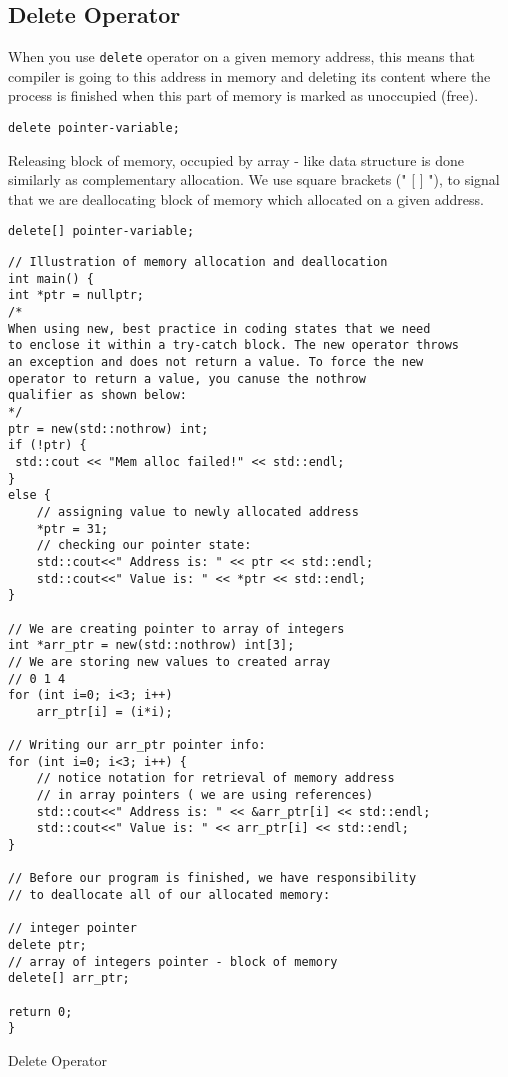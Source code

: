 \documentclass[11pt, a4paper]{article}
\begin{document}
\subsection{Delete Operator}%
\label{sub:delete_operator}


When you use \texttt{delete} operator on a given memory address, this means that compiler is going to this address in memory and deleting its content where the process is finished when this part of memory is marked as unoccupied (free).



\texttt{delete pointer-variable;} 


Releasing block of memory, occupied by array - like data structure is done similarly as complementary allocation. We use square brackets (" [ ] "), to signal that we are deallocating block of memory which allocated on a given address.




\texttt{delete[] pointer-variable;} 





\begin{listing}
\begin{verbatim}
// Illustration of memory allocation and deallocation
int main() {
int *ptr = nullptr;
/*
When using new, best practice in coding states that we need
to enclose it within a try-catch block. The new operator throws
an exception and does not return a value. To force the new
operator to return a value, you canuse the nothrow
qualifier as shown below:
*/
ptr = new(std::nothrow) int;
if (!ptr) {
 std::cout << "Mem alloc failed!" << std::endl;
}
else {
    // assigning value to newly allocated address
    *ptr = 31;
    // checking our pointer state:
    std::cout<<" Address is: " << ptr << std::endl;
    std::cout<<" Value is: " << *ptr << std::endl;
}

// We are creating pointer to array of integers
int *arr_ptr = new(std::nothrow) int[3];
// We are storing new values to created array
// 0 1 4
for (int i=0; i<3; i++)
    arr_ptr[i] = (i*i);

// Writing our arr_ptr pointer info:
for (int i=0; i<3; i++) {
    // notice notation for retrieval of memory address
    // in array pointers ( we are using references)
    std::cout<<" Address is: " << &arr_ptr[i] << std::endl;
    std::cout<<" Value is: " << arr_ptr[i] << std::endl;
}

// Before our program is finished, we have responsibility
// to deallocate all of our allocated memory:

// integer pointer
delete ptr;
// array of integers pointer - block of memory
delete[] arr_ptr;

return 0;
}
\end{verbatim}
\caption{Delete Operator}
\label{lst:delete_operator}
\end{listing}
\end{document}
